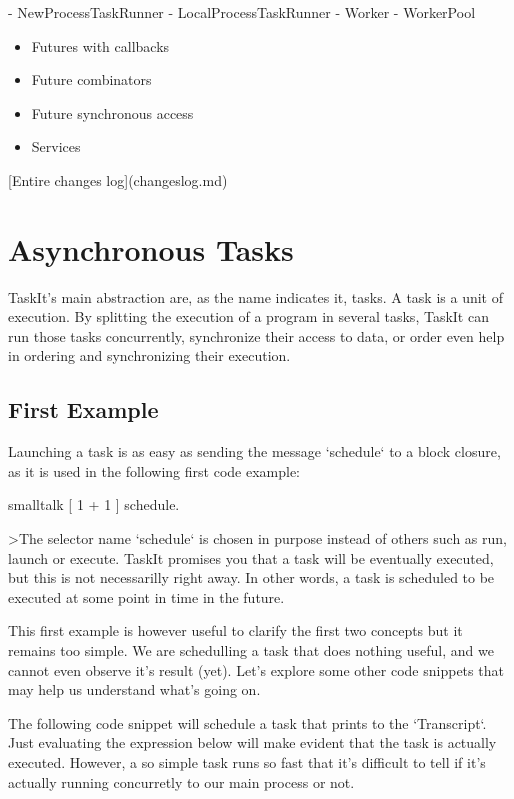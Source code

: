 \documentclass[10pt,twoside,english]{_support/latex/sbabook/sbabook}
\begin{document}
  - NewProcessTaskRunner
  - LocalProcessTaskRunner
  - Worker
  - WorkerPool

\begin{itemize}
\item Futures with callbacks
\item Future combinators
\item Future synchronous access
\item Services
\end{itemize}

{[}Entire changes log{]}(changeslog.md)
\chapter{Asynchronous Tasks}
TaskIt's main abstraction are, as the name indicates it, tasks. A task is a unit of execution. By splitting the execution of a program in several tasks, TaskIt can run those tasks concurrently, synchronize their access to data, or order even help in ordering and synchronizing their execution.
\section{First Example}
Launching a task is as easy as sending the message `schedule` to a block closure, as it is used in the following first code example:

\begin{displaycode}{smalltalk}
[ 1 + 1 ] schedule.
\end{displaycode}

\textgreater{}The selector name `schedule` is chosen in purpose instead of others such as run, launch or execute. TaskIt promises you that a task will be eventually executed, but this is not necessarilly right away. In other words, a task is scheduled to be executed at some point in time in the future.

This first example is however useful to clarify the first two concepts but it remains too simple. We are schedulling a task that does nothing useful, and we cannot even observe it's result (yet). Let's explore some other code snippets that may help us understand what's going on.

The following code snippet will schedule a task that prints to the `Transcript`. Just evaluating the expression below will make evident that the task is actually executed. However, a so simple task runs so fast that it's difficult to tell if it's actually running concurretly to our main process or not.
\end{document}
